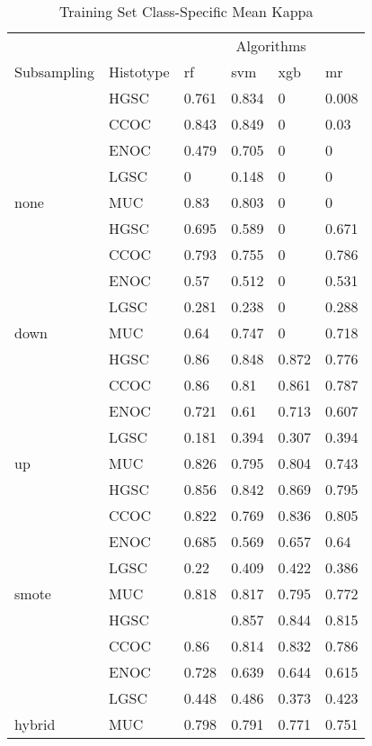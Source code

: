 \documentclass[
]{report}
\begin{document}
\begin{table}

\caption{\label{tab:train-kappa-class-table}Training Set Class-Specific Mean Kappa}
\centering
\begin{tabular}[t]{l|l|l|l|l|l}
\hline
\multicolumn{2}{c|}{ } & \multicolumn{4}{c}{Algorithms} \\
\cline{3-6}
Subsampling & Histotype & rf & svm & xgb & mr\\
\hline
 & HGSC & 0.761 & 0.834 & 0 & 0.008\\
\cline{2-6}
 & CCOC & 0.843 & 0.849 & 0 & 0.03\\
\cline{2-6}
 & ENOC & 0.479 & 0.705 & 0 & 0\\
\cline{2-6}
 & LGSC & 0 & 0.148 & 0 & 0\\
\cline{2-6}
\multirow{-5}{*}{\raggedright\arraybackslash none} & MUC & 0.83 & 0.803 & 0 & 0\\
\cline{1-6}
 & HGSC & 0.695 & 0.589 & 0 & 0.671\\
\cline{2-6}
 & CCOC & 0.793 & 0.755 & 0 & 0.786\\
\cline{2-6}
 & ENOC & 0.57 & 0.512 & 0 & 0.531\\
\cline{2-6}
 & LGSC & 0.281 & 0.238 & 0 & 0.288\\
\cline{2-6}
\multirow{-5}{*}{\raggedright\arraybackslash down} & MUC & 0.64 & 0.747 & 0 & 0.718\\
\cline{1-6}
 & HGSC & 0.86 & 0.848 & 0.872 & 0.776\\
\cline{2-6}
 & CCOC & 0.86 & 0.81 & 0.861 & 0.787\\
\cline{2-6}
 & ENOC & 0.721 & 0.61 & 0.713 & 0.607\\
\cline{2-6}
 & LGSC & 0.181 & 0.394 & 0.307 & 0.394\\
\cline{2-6}
\multirow{-5}{*}{\raggedright\arraybackslash up} & MUC & 0.826 & 0.795 & 0.804 & 0.743\\
\cline{1-6}
 & HGSC & 0.856 & 0.842 & 0.869 & 0.795\\
\cline{2-6}
 & CCOC & 0.822 & 0.769 & 0.836 & 0.805\\
\cline{2-6}
 & ENOC & 0.685 & 0.569 & 0.657 & 0.64\\
\cline{2-6}
 & LGSC & 0.22 & 0.409 & 0.422 & 0.386\\
\cline{2-6}
\multirow{-5}{*}{\raggedright\arraybackslash smote} & MUC & 0.818 & 0.817 & 0.795 & 0.772\\
\cline{1-6}
 & HGSC & \cellcolor[HTML]{90ee90}{0.876} & 0.857 & 0.844 & 0.815\\
\cline{2-6}
 & CCOC & 0.86 & 0.814 & 0.832 & 0.786\\
\cline{2-6}
 & ENOC & 0.728 & 0.639 & 0.644 & 0.615\\
\cline{2-6}
 & LGSC & 0.448 & 0.486 & 0.373 & 0.423\\
\cline{2-6}
\multirow{-5}{*}{\raggedright\arraybackslash hybrid} & MUC & 0.798 & 0.791 & 0.771 & 0.751\\
\hline
\end{tabular}
\end{table}
\end{document}
